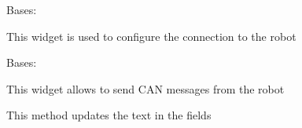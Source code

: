 \documentclass[letterpaper,10pt,english]{sphinxmanual}
\begin{document}
\begin{fulllineitems}
\label{gui:gui.communication.EditHost}
Bases: 

This widget is used to configure the connection to the robot

\end{fulllineitems}


\begin{fulllineitems}
\label{gui:gui.communication.SendCan}
Bases: 

This widget allows to send CAN messages from the robot

\begin{fulllineitems}
\label{gui:gui.communication.SendCan.selection_changed}
This method updates the text in the fields

\end{fulllineitems}


\end{fulllineitems}

\end{document}
